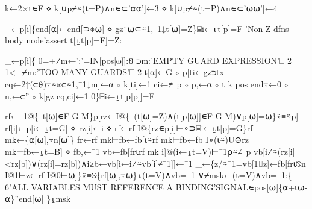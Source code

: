 \documentclass{article}%
\begin{document}
\nwenddocs{}\endmoddef\nwstartdeflinemarkup{}\nwenddeflinemarkup
k←2×t∊F ⋄ k[∪p⌿⍨(t=P)∧n∊⊂'⍺⍺']←3 ⋄ k[∪p⌿⍨(t=P)∧n∊⊂'⍵⍵']←4
\nwendcode{}\nwdocspar

\nwenddocs{}\endmoddef\nwstartdeflinemarkup{}\nwenddeflinemarkup
_←p[i]\{end[⍺]←end[⊃⌽⍵] ⋄ gz¨⍵⊂⍨1,¯1↓t[⍵]=Z\}⌸i←⍸t[p]=F
'Non-Z dfns body node'assert t[⍸t[p]=F]=Z:
\nwendcode{}\nwdocspar

\nwenddocs{}\endmoddef\nwstartdeflinemarkup{}\nwenddeflinemarkup
_←p[i]\{
        0=+⌿m←':'=IN[pos[⍵]]:⍬
        ⊃m:'EMPTY GUARD  EXPRESSION'⎕ 2
        1<+⌿m:'TOO MANY GUARDS'⎕ 2
        t[⍺]←G ⋄ p[ti←gz⊃tx cq←2↑(⊂⍬)⍪⍨⍵⊂⍨1,¯1↓m]←⍺ ⋄ k[ti]←1
        ci←≢p ⋄ p,←⍺ ⋄ t k pos end⍪←0 ⋄ n,←⊂'' ⋄ k[gz cq,ci]←1
0\}⌸i←⍸t[p[p]]=F
\nwendcode{}\nwdocspar

\nwenddocs{}\endmoddef\nwstartdeflinemarkup{}\nwenddeflinemarkup
rf←¯1@\{~t[⍵]∊F G M\}p[rz←I@\{~(t[⍵]=Z)∧(t[p[⍵]]∊F G M)∨p[⍵]=⍵\}⍣≡⍨p]
rf[i]←p[i←⍸t=G] ⋄ rz[i]←i ⋄ rf←rf I@\{rz∊p[i]⊢∘⊃⌸i←⍸t[p]=G\}rf
mk←\{⍺[⍵],⍪n[⍵]\}
fr←rf mk⊢fb←fb[⍳⍨rf mk⊢fb←fb I∘(⍳⍨)U⊖rz mk⊢fb←⍸t=B] ⋄ fb,←¯1
vb←fb[fr⍳rf mk i]@(i←⍸t=V)⊢¯1⍴⍨≢p
vb[i⌿⍨(rz[i]<rz[b])∨(rz[i]=rz[b])∧i≥b←vb[i←i⌿⍨vb[i]≠¯1]]←¯1
_←\{z/⍨¯1=vb[1⌷z]←fb[fr⍳⍉n I@1⊢z←rf I@0⊢⍵]\}⍣≡⍉\{rf[⍵],⍪⍵\}⍸(t=V)∧vb=¯1
∨⌿msk←(t=V)∧vb=¯1:\{
        6'ALL VARIABLES MUST REFERENCE A BINDING'SIGNAL∊pos[⍵]\{⍺+⍳⍵-⍺\}¨end[⍵]
\}⍸msk
\nwendcode{}\nwdocspar
\end{document}
